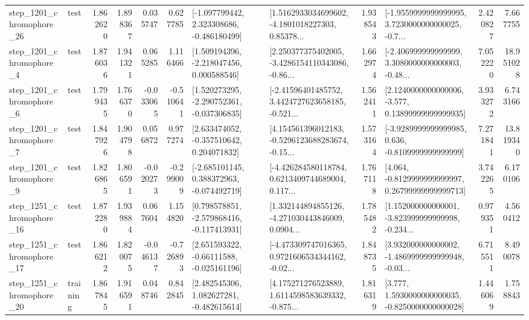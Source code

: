\begin{tabular}{llrrrrllrlrr}
 step\_1201\_chromophore\_26 &      test &      1.862620 &    1.898367 &      0.035747 &  0.627785 &   [-1.097799442, 2.323308686, -0.486180499] &  [1.5162933034699602, -4.1801018227303, 0.85378... &       1.938543 &  [-1.9559999999999995, 3.7230000000000025, -0.7... &            2.420827 &          7.667755 \\
  step\_1201\_chromophore\_4 &      test &      1.876036 &    1.941321 &      0.065285 &  1.116466 &    [1.509194396, -2.218047456, 0.000588546] &  [2.250377375402005, -3.4286154110343086, -0.86... &       1.662974 &  [-2.406999999999999, 3.3080000000000003, -0.48... &            7.052220 &         18.951028 \\
  step\_1201\_chromophore\_6 &      test &      1.799435 &    1.766370 &     -0.033065 & -0.510641 &   [1.520273295, -2.290752361, -0.037306835] &  [-2.41596401485752, 3.4424727623658185, -0.521... &       1.562411 &  [2.1240000000000006, -3.577, 0.13899999999999935] &            3.933272 &          6.743166 \\
  step\_1201\_chromophore\_7 &      test &      1.847926 &    1.904798 &      0.056872 &  0.977274 &    [2.633474052, -0.357510642, 0.204071832] &  [4.154561396012183, -0.5296123688283674, -0.15... &       1.573164 &  [-3.9289999999999985, 0.636, -0.8109999999999999] &            7.271841 &         13.819340 \\
  step\_1201\_chromophore\_9 &      test &      1.826865 &    1.806591 &     -0.020273 & -0.299009 &   [-2.685101145, 0.388372963, -0.074492719] &  [-4.426284580118784, 0.6213409744689004, 0.117... &       1.767118 &  [4.064, -0.8129999999999997, 0.26799999999999713] &            3.742265 &          6.170106 \\
 step\_1251\_chromophore\_16 &      test &      1.872280 &    1.939884 &      0.067604 &  1.154820 &   [0.798578851, -2.579868416, -0.117413931] &  [1.332144894855126, -4.271030443846009, 0.0904... &       1.785482 &  [1.152000000000001, -3.823999999999998, -0.234... &            0.979351 &          4.560412 \\
 step\_1251\_chromophore\_17 &      test &      1.866212 &    1.820075 &     -0.046137 & -0.726893 &    [2.651593322, -0.66111588, -0.025161196] &  [-4.473309747016365, 0.9721606534344162, -0.02... &       1.848735 &  [3.932000000000002, -1.4869999999999948, -0.03... &            6.715511 &          8.490078 \\
 step\_1251\_chromophore\_20 &  training &      1.867845 &    1.916591 &      0.048746 &  0.842845 &    [2.482545306, 1.082627281, -0.482615614] &  [4.175271276523889, 1.6114598583639332, -0.875... &       1.816319 &   [3.777, 1.5930000000000035, -0.8250000000000028] &            1.446069 &          1.758843 \\

\end{tabular}
